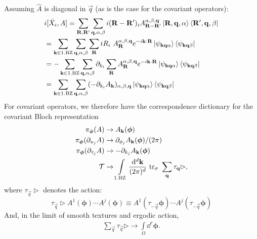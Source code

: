 \documentclass[
    10pt,
    aps,
    prb,
    twocolumn,
    floatfix,
    superscriptaddress,
]{revtex4-2}
\begin{document}
Assuming $\hat{A}$ is diagonal in $\vec{q}$ (as is the case for the covariant operators):
\begin{align}
	&i [ \hat{X}_i, A]
	 =  \sum_{\mathbf{R}, \mathbf{R}'} \sum_{\mathbf{q} , \alpha, \beta}
	i(\mathbf{R}-\mathbf{R}')_i A_{\mathbf{R}-\mathbf{R}'}^{ \alpha, \beta, \mathbf{q}} \ket{\mathbf{R}, \mathbf{q}, \alpha} \bra{\mathbf{R}',\mathbf{q}, \beta}
	\notag \\
	& =    \sum_{\mathbf{k} \in \mathrm{1. BZ}} \sum_{\mathbf{q} , \alpha, \beta}
	\sum_{\mathbf{R}}   i R_i~ A_{\mathbf{R}}^{ \alpha, \beta, \mathbf{q}} 
	e^{-i \mathbf{k}\cdot\mathbf{R}} 
	\ket{\psi_{\mathbf{k} \mathbf{q} \alpha}} \bra{\psi_{\mathbf{k} \mathbf{q} \beta}}
	\notag \\
	& =   -\sum_{\mathbf{k} \in \mathrm{1. BZ}} \sum_{\mathbf{q} , \alpha, \beta}\partial_{k_i}
	\sum_{\mathbf{R}}   A_{\mathbf{R}}^{ \alpha, \beta, \mathbf{q}} 
	e^{-i \mathbf{k}\cdot\mathbf{R}} 
	\ket{\psi_{\mathbf{k} \mathbf{q} \alpha}} \bra{\psi_{\mathbf{k} \mathbf{q} \beta}}
	\notag \\
	& =   \sum_{\mathbf{k} \in \mathrm{1. BZ}}\sum_{\mathbf{q} , \alpha, \beta}
	(-\partial_{k_i}A_{\mathbf{k}})_{ \alpha, \beta, \mathbf{q}}
	\ket{\psi_{\mathbf{k} \mathbf{q} \alpha}} \bra{\psi_{\mathbf{k} \mathbf{q} \beta}} 
\end{align}
For covariant operators, we therefore have the correspondence dictionary for the covariant Bloch representation
\begin{align}
	\pi_{\boldsymbol{\phi}}(A)
	& \to A_{\mathbf{k}}(\boldsymbol{\phi})
	\label{eq:rep1}
\\
	\pi_{\boldsymbol{\phi}}(\partial_{u_j} A)
	& 
	\to \partial_{\phi_j} A_{\mathbf{k}}(\boldsymbol{\phi}) / (2\pi)
	\label{eq:rep2}
	\\
	\pi_{\boldsymbol{\phi}}(\partial_{\tau_j} A)
	& 
	\to -\partial_{k_j} A_{\mathbf{k}}(\boldsymbol{\phi}) 
	\label{eq:rep3}
\\
 \mathcal{T} & \to  \int\limits_{\mathrm{1.BZ}} \frac{\mathrm{d}^d \mathbf{k}}{(2\pi)^d}~ \mathrm{tr}_\sigma ~ \sum_{\mathbf{q}}\tau_{\mathbf{q}} \rhd,
\end{align}
where $\tau_{\vec{q}} \rhd$ denotes the action: 
\begin{equation}
	\tau_{\vec{q}} \rhd A^1( \boldsymbol{\phi}) \cdots  A^j( \boldsymbol{\phi}) \equiv A^1( \tau_{-\vec{q}}\boldsymbol{\phi}) \cdots  A^j( \tau_{-\vec{q}}\boldsymbol{\phi})
\end{equation}
And, in the limit of smooth textures and ergodic action,
\begin{align}
	\sum_{\vec{q}}\tau_{\vec{q}} \rhd \to \int\limits_{\Omega }\dd^r \boldsymbol{\phi} .
\end{align}
\end{document}
